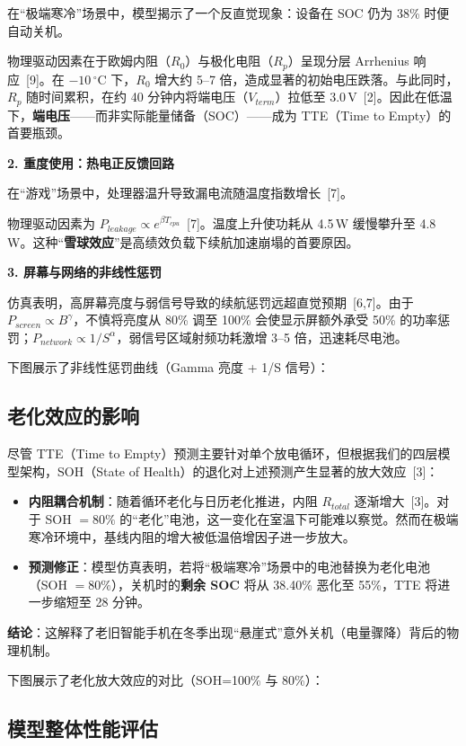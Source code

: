 \documentclass[11pt,a4paper]{ctexart}
\newcommand{\degC}{\ensuremath{^{\circ}\mathrm{C}}}
\begin{document}
在“极端寒冷”场景中，模型揭示了一个反直觉现象：设备在 SOC 仍为 38\% 时便自动关机。

物理驱动因素在于欧姆内阻（$R_0$）与极化电阻（$R_p$）呈现分层 Arrhenius 响应~[9]。在 $-10\,\degC$ 下，$R_0$ 增大约 5--7 倍，造成显著的初始电压跌落。与此同时，$R_p$ 随时间累积，在约 40 分钟内将端电压（$V_{term}$）拉低至 3.0\,V~[2]。因此在低温下，\textbf{端电压}——而非实际能量储备（SOC）——成为 TTE（Time to Empty）的首要瓶颈。

\textbf{2. 重度使用：热电正反馈回路}

在“游戏”场景中，处理器温升导致漏电流随温度指数增长~[7]。

物理驱动因素为 $P_{leakage}\propto e^{\beta T_{cpu}}$~[7]。温度上升使功耗从 4.5\,W 缓慢攀升至 4.8\,W。这种“\textbf{雪球效应}”是高绩效负载下续航加速崩塌的首要原因。

\textbf{3. 屏幕与网络的非线性惩罚}

仿真表明，高屏幕亮度与弱信号导致的续航惩罚远超直觉预期~[6,7]。由于 $P_{screen}\propto B^{\gamma}$，不慎将亮度从 80\% 调至 100\% 会使显示屏额外承受 50\% 的功率惩罚；$P_{network}\propto 1/S^{\alpha}$，弱信号区域射频功耗激增 3--5 倍，迅速耗尽电池。

下图展示了非线性惩罚曲线（Gamma 亮度 + 1/S 信号）：

\subsection{老化效应的影响}

尽管 TTE（Time to Empty）预测主要针对单个放电循环，但根据我们的四层模型架构，SOH（State of Health）的退化对上述预测产生显著的放大效应~[3]：

\begin{itemize}
\item \textbf{内阻耦合机制}：随着循环老化与日历老化推进，内阻 $R_{total}$ 逐渐增大~[3]。对于 SOH $=80\%$ 的“老化”电池，这一变化在室温下可能难以察觉。然而在极端寒冷环境中，基线内阻的增大被低温倍增因子进一步放大。
\item \textbf{预测修正}：模型仿真表明，若将“极端寒冷”场景中的电池替换为老化电池（SOH $=80\%$），关机时的\textbf{剩余 SOC} 将从 38.40\% 恶化至 55\%，TTE 将进一步缩短至 28 分钟。
\end{itemize}

\textbf{结论}：这解释了老旧智能手机在冬季出现“悬崖式”意外关机（电量骤降）背后的物理机制。

下图展示了老化放大效应的对比（SOH=100\% 与 80\%）：

\subsection{模型整体性能评估}
\end{document}
